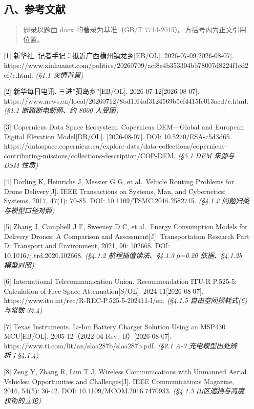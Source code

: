 \documentclass[
  10.5pt,
]{article}
\begin{document}
\subsection{八、参考文献}\label{ux516bux53c2ux8003ux6587ux732e}

\begin{quote}
题录以题面 docx 的著录为基准（GB/T 7714-2015）。方括号内为正文引用位置。
\end{quote}

{[}1{]} 新华社. 记者手记：抵近广西横州镇龙乡{[}EB/OL{]}.
2026-07-09{[}2026-08-07{]}.
https://www.xinhuanet.com/politics/20260709/acf8e4b353304bb78007d8224f1cd2ef/c.html.
\emph{(§1.1 灾情背景)}

{[}2{]} 新华每日电讯. 三进''孤岛乡''{[}EB/OL{]}.
2026-07-12{[}2026-08-07{]}.
https://www.news.cn/local/20260712/8bd1f64af3124569b5cf4415fc013acd/c.html.
\emph{(§1.1 断路断电断网、约 8000 人受困)}

{[}3{]} Copernicus Data Space Ecosystem. Copernicus DEM---Global and
European Digital Elevation Model{[}DB/OL{]}. {[}2026-08-07{]}. DOI:
10.5270/ESA-c5d3d65.
https://dataspace.copernicus.eu/explore-data/data-collections/copernicus-contributing-missions/collections-description/COP-DEM.
\emph{(§5.1 DEM 来源与 DSM 性质)}

{[}4{]} Dorling K, Heinrichs J, Messier G G, et al.~Vehicle Routing
Problems for Drone Delivery{[}J{]}. IEEE Transactions on Systems, Man,
and Cybernetics: Systems, 2017, 47(1): 70-85. DOI:
10.1109/TSMC.2016.2582745. \emph{(§4.1.2 问题归类与模型口径对照)}

{[}5{]} Zhang J, Campbell J F, Sweeney D C, et al.~Energy Consumption
Models for Delivery Drones: A Comparison and Assessment{[}J{]}.
Transportation Research Part D: Transport and Environment, 2021, 90:
102668. DOI: 10.1016/j.trd.2020.102668. \emph{(§4.1.2
航程插值读法、§4.1.3 ρ=0.20 依据、§4.1.2b 模型对照)}

{[}6{]} International Telecommunication Union. Recommendation ITU-R
P.525-5: Calculation of Free-Space Attenuation{[}S/OL{]}.
2024-11{[}2026-08-07{]}.
https://www.itu.int/rec/R-REC-P.525-5-202411-I/en. \emph{(§4.1.5
自由空间损耗式(6) 与常数 32.4)}

{[}7{]} Texas Instruments. Li-Ion Battery Charger Solution Using an
MSP430 MCU{[}EB/OL{]}. 2005-12（2022-04 Rev.~B）{[}2026-08-07{]}.
https://www.ti.com/lit/an/slaa287b/slaa287b.pdf. \emph{(§2.1 A-3
充电模型出处辨析；§4.1.4)}

{[}8{]} Zeng Y, Zhang R, Lim T J. Wireless Communications with Unmanned
Aerial Vehicles: Opportunities and Challenges{[}J{]}. IEEE
Communications Magazine, 2016, 54(5): 36-42. DOI:
10.1109/MCOM.2016.7470933. \emph{(§4.1.5 山区遮挡与高度权衡的立论)}
\end{document}
